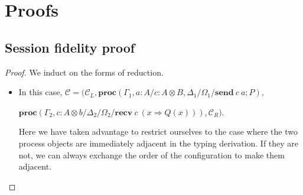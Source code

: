 \documentclass[12pt, openany]{memoir}
\newcommand*{\send}[2]{\textbf{send}\ #1\ #2}
\newcommand*{\recv}[2]{\textbf{recv}\ #1\ #2}
\newcommand*{\procObj}[4]{\textbf{proc}(#1/#2/#3/#4)}
\newcommand*{\config}[0]{\mathcal{C}}
\begin{document}
\appendix
\chapter{Proofs}
\section{Session fidelity proof}\label{sec::fidelityproof}
\begin{proof}
  We induct on the forms of reduction.
  \begin{itemize}
    \item [\stepref{channel-reduction-r}{channel-r}] In this case, $\config = (\config_L, \procObj{\Gamma_1, a : A}{c : A \otimes B, \Delta_1}{\Omega_1}{\send{c}{a}; P},$
   
    $\procObj{\Gamma_2, c : A \otimes b}{\Delta_2}{\Omega_2}{\recv{c}{(x \Rightarrow Q(x))}}, \config_R)$.
    
    Here we have taken advantage to restrict ourselves to the case
    where the two process objects are immediately adjacent in the typing derivation.
    If they are not, we can always exchange the order of the configuration to make them adjacent.


\end{itemize}
\end{proof}
\end{document}
